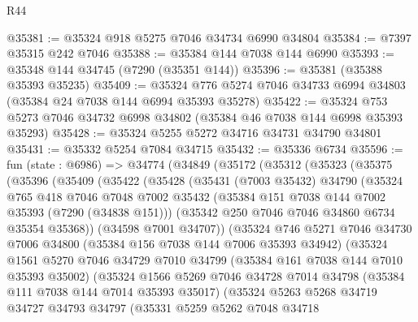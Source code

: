 \begin{lexlean}{R44}
\begin{coremodule}
{@35381 := @35324 @918 @5275 @7046 @34734 @6990 @34804
@35384 := @7397 @35315 @242 @7046
@35388 := @35384 @144 @7038 @144 @6990
@35393 := @35348 @144 @34745 (@7290 (@35351 @144))
@35396 := @35381 (@35388 @35393 @35235)
@35409 := @35324 @776 @5274 @7046 @34733 @6994 @34803 (@35384 @24 @7038 @144 @6994 @35393 @35278)
@35422 := @35324 @753 @5273 @7046 @34732 @6998 @34802 (@35384 @46 @7038 @144 @6998 @35393 @35293)
@35428 := @35324 @5255 @5272 @34716 @34731 @34790 @34801
@35431 := @35332 @5254 @7084 @34715
@35432 := @35336 @6734
@35596 := fun (state : @6986) =>
  @34774
    (@34849
      (@35172
        (@35312
          (@35323
            (@35375
              (@35396
                (@35409
                  (@35422
                    (@35428
                      (@35431
                        (@7003 @35432)
                        @34790
                        (@35324
                          @765
                          @418
                          @7046
                          @7048
                          @7002
                          @35432
                          (@35384 @151 @7038 @144 @7002 @35393 (@7290 (@34838 @151)))
                          (@35342 @250 @7046 @7046 @34860 @6734 @35354 @35368))
                        (@34598 @7001 @34707))
                      (@35324
                        @746
                        @5271
                        @7046
                        @34730
                        @7006
                        @34800
                        (@35384 @156 @7038 @144 @7006 @35393 @34942)
                        (@35324
                          @1561
                          @5270
                          @7046
                          @34729
                          @7010
                          @34799
                          (@35384 @161 @7038 @144 @7010 @35393 @35002)
                          (@35324
                            @1566
                            @5269
                            @7046
                            @34728
                            @7014
                            @34798
                            (@35384 @111 @7038 @144 @7014 @35393 @35017)
                            (@35324
                              @5263
                              @5268
                              @34719
                              @34727
                              @34793
                              @34797
                              (@35331
                                @5259
                                @5262
                                @7048
                                @34718
}
\end{coremodule}
\end{lexlean}
